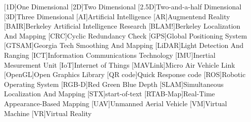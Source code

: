 \begin{acronym}
  [1D]{One Dimensional}
  [2D]{Two Dimensional}
  [2.5D]{Two\hyp{}and\hyp{}a\hyp{}half Dimensional}
  [3D]{Three Dimensional}
  [AI]{Artificial Intelligence}
  [AR]{Augmentend Reality}
  [BAIR]{Berkeley Artificial Intelligence Research}
  [BLAM!]{Berkeley Localization And Mapping}
  [CRC]{Cyclic Redundancy Check}
  [GPS]{Global Positioning System}
  [GTSAM]{Georgia Tech Smoothing And Mapping}
  [LiDAR]{Light Detection And Ranging}
  [ICT]{Information Communications Technology}
  [IMU]{Inertial Mesurement Unit}
  [IoT]{Internet of Things}
  [MAVLink]{Micro Air Vehicle Link}
  [OpenGL]{Open Graphics Library}
  [QR code]{Quick Response code}
  [ROS]{Robotic Operating System}
  [RGB\hyp{}D]{Red Green Blue Depth}
  [SLAM]{Simultaneous Localization And Mapping}
  [STX]{start\hyp{}of\hyp{}text}
  [RTAB\hyp{}Map]{Real\hyp{}Time Appearance\hyp{}Based Mapping}
  [UAV]{Unmanned Aerial Vehicle}
  [VM]{Virtual Machine}
  [VR]{Virtual Reality}
\end{acronym}